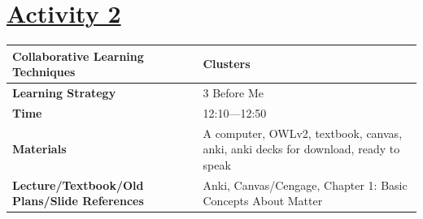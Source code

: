 \documentclass{article}
\begin{document}
\newpage
\noindent
\section*{\underline{Activity 2}}
\begin{tabular}{|p{4.2cm}|p{9.8cm}|}
\hline
\textbf{Collaborative Learning Techniques} & Clusters \\
\hline
\textbf{Learning Strategy} & 3 Before Me \\
\hline
\textbf{Time} & 12:10---12:50 \\
\hline
\textbf{Materials} & A computer, OWLv2, textbook, canvas, anki, anki decks for download, ready to speak \\
\hline
\textbf{Lecture/Textbook/Old Plans/Slide References} & Anki, Canvas/Cengage, Chapter 1: Basic Concepts About Matter \\
\hline
\end{tabular}
\end{document}

